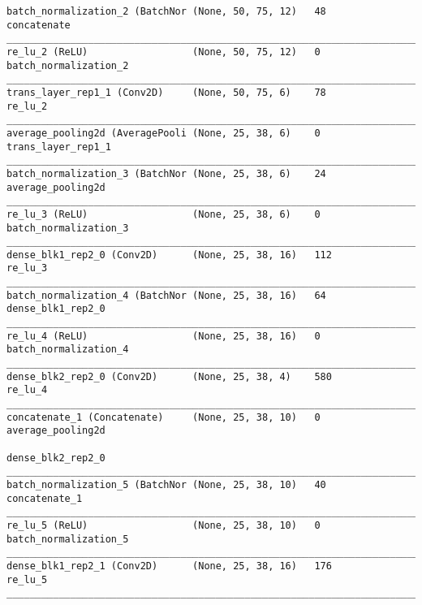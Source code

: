 \begin{verbatim}
batch_normalization_2 (BatchNor (None, 50, 75, 12)   48          concatenate                
__________________________________________________________________________________________
re_lu_2 (ReLU)                  (None, 50, 75, 12)   0           batch_normalization_2      
__________________________________________________________________________________________
trans_layer_rep1_1 (Conv2D)     (None, 50, 75, 6)    78          re_lu_2                    
__________________________________________________________________________________________
average_pooling2d (AveragePooli (None, 25, 38, 6)    0           trans_layer_rep1_1         
__________________________________________________________________________________________
batch_normalization_3 (BatchNor (None, 25, 38, 6)    24          average_pooling2d          
__________________________________________________________________________________________
re_lu_3 (ReLU)                  (None, 25, 38, 6)    0           batch_normalization_3      
__________________________________________________________________________________________
dense_blk1_rep2_0 (Conv2D)      (None, 25, 38, 16)   112         re_lu_3                    
__________________________________________________________________________________________
batch_normalization_4 (BatchNor (None, 25, 38, 16)   64          dense_blk1_rep2_0          
__________________________________________________________________________________________
re_lu_4 (ReLU)                  (None, 25, 38, 16)   0           batch_normalization_4      
__________________________________________________________________________________________
dense_blk2_rep2_0 (Conv2D)      (None, 25, 38, 4)    580         re_lu_4                    
__________________________________________________________________________________________
concatenate_1 (Concatenate)     (None, 25, 38, 10)   0           average_pooling2d          
                                                                 dense_blk2_rep2_0          
__________________________________________________________________________________________
batch_normalization_5 (BatchNor (None, 25, 38, 10)   40          concatenate_1              
__________________________________________________________________________________________
re_lu_5 (ReLU)                  (None, 25, 38, 10)   0           batch_normalization_5      
__________________________________________________________________________________________
dense_blk1_rep2_1 (Conv2D)      (None, 25, 38, 16)   176         re_lu_5                    
__________________________________________________________________________________________

\end{verbatim}
